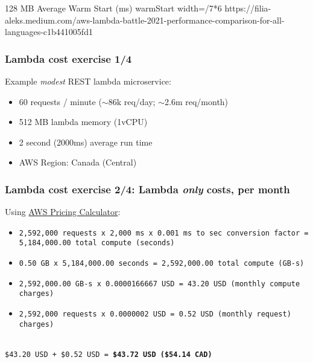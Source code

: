 \documentclass[11pt,aspectratio=169]{beamer}
\begin{document}
\nrcanGraphicFrame
  {128 MB Average Warm Start (ms)}
  {warmStart}
  {width=\paperwidth/7*6}
  {https://filia-aleks.medium.com/aws-lambda-battle-2021-performance-comparison-for-all-languages-c1b441005fd1}


\begin{nrcanFrame}
  \frametitle{Lambda cost exercise 1/4}
  Example \textit{modest} REST lambda microservice:
  \begin{itemize}
  \item 60 requests / minute ($\sim$86k req/day; $\sim$2.6m req/month)
  \item 512 MB lambda memory (1vCPU)
  \item 2 second (2000ms) average run time
  \item AWS Region: Canada (Central)
  \end{itemize}
\end{nrcanFrame}


\begin{nrcanFrame}
  \frametitle{Lambda cost exercise 2/4: Lambda \textit{only} costs, per month}
  Using
  \href{https://calculator.aws/\#/createCalculator/Lambda}
       {AWS Pricing Calculator}:
  \ \\
      {\footnotesize
        \begin{itemize}
        \item \texttt{2,592,000 requests x 2,000 ms x 0.001 ms to sec conversion factor = 5,184,000.00 total compute (seconds)}
        \item \texttt{0.50 GB x 5,184,000.00 seconds = 2,592,000.00 total compute (GB-s)}
        \item \texttt{2,592,000.00 GB-s x 0.0000166667 USD = 43.20 USD (monthly compute charges)}
        \item \texttt{2,592,000 requests x 0.0000002 USD = 0.52 USD (monthly request) charges)}
        \end{itemize}
        }
            \ \\
      \texttt{\$43.20 USD + \$0.52 USD = \textbf{\$43.72 USD (\$54.14 CAD)}}

\end{nrcanFrame}
\end{document}
